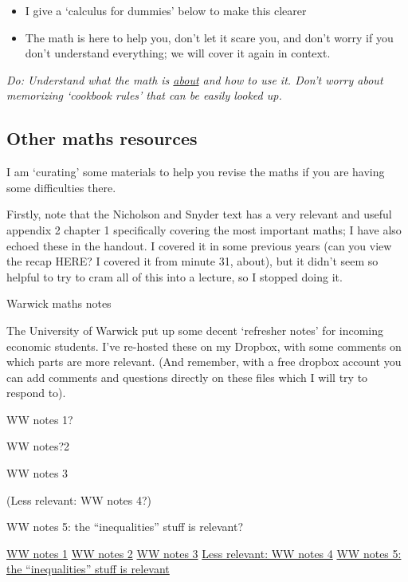 \documentclass[]{article}
\begin{document}
\begin{itemize}
\item
  I give a `calculus for dummies' below to make this clearer
\item
  The math is here to help you, don't let it scare you, and don't worry if you don't understand everything; we will cover it again in context.
\end{itemize}

\emph{Do: Understand what the math is \underline{about} and how to use it. Don't worry about memorizing `cookbook rules' that can be easily looked up.}

\bigskip

\hypertarget{other-maths-resources}{%
\subsection{Other maths resources}\label{other-maths-resources}}

I am `curating' some materials to help you revise the maths if you are having some difficulties there.

Firstly, note that the Nicholson and Snyder text has a very relevant and useful appendix 2 chapter 1 specifically covering the most important maths; I have also echoed these in the handout. I covered it in some previous years (can you view the recap HERE? I covered it from minute 31, about), but it didn't seem so helpful to try to cram all of this into a lecture, so I stopped doing it.

\bigskip

Warwick maths notes

The University of Warwick put up some decent `refresher notes' for incoming economic students. I've re-hosted these on my Dropbox, with some comments on which parts are more relevant. (And remember, with a free dropbox account you can add comments and questions directly on these files which I will try to respond to).

WW notes 1?

WW notes?2

WW notes 3

(Less relevant: WW notes 4?)

WW notes 5: the ``inequalities'' stuff is relevant?

\href{https://www.dropbox.com/s/99ugisobfvuc15e/Warwick_maths-revision-notes-1_drcomments.pdf?dl=0\%22\%3EWW\%20notes\%201}{WW notes 1}
\href{href=\%22https://www.dropbox.com/s/93xw3hwv9oqlymn/WW_maths-revision-notes-2_drcomments.pdf?dl=0\%22\%3EWW\%20notes?2}{WW notes 2}
\href{https://www.dropbox.com/s/93xw3hwv9oqlymn/WW_maths-revision-notes-2_drcomments.pdf?dl=0}{WW notes 3}
\href{https://www.dropbox.com/s/0ppmpw5t5anfpd8/WW_maths-revision-notes-4_Drcomments_slightlylessrelevant.pdf?dl=0}{Less relevant: WW notes 4}
\href{https://www.dropbox.com/s/0ppmpw5t5anfpd8/WW_maths-revision-notes-4_Drcomments_slightlylessrelevant.pdf?dl=0}{WW notes 5: the ``inequalities'' stuff is relevant}
\end{document}
